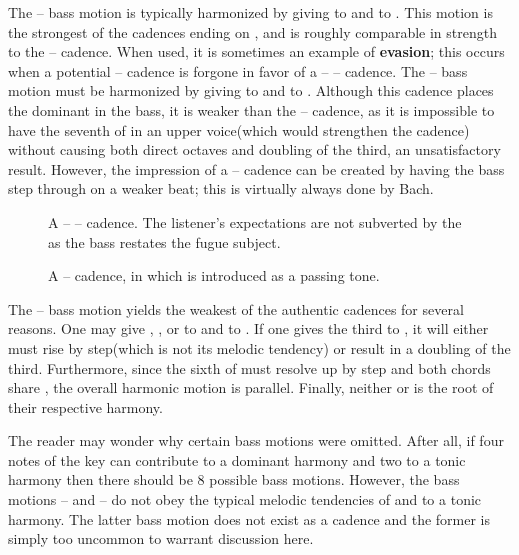 The  --  bass motion is typically harmonized by giving  to  and  to . This motion is the strongest of the cadences ending on , and is roughly comparable in strength to the  --  cadence. When used, it is sometimes an example of \textbf{evasion}; this occurs when a potential  --  cadence is forgone in favor of a  --  --  cadence. The  --  bass motion must be harmonized by giving  to  and  to . Although this cadence places the dominant in the bass, it is weaker than the  --  cadence, as it is impossible to have the seventh of  in an upper voice(which would strengthen the cadence) without causing both direct octaves and doubling of the third, an unsatisfactory result. However, the impression of a  --  cadence can be created by having the bass step through  on a weaker beat; this is virtually always done by Bach.
\begin{figure}[h]
\centering
{}
\caption{A  --  --  cadence. The listener's expectations are not subverted by the  as the bass restates the fugue subject. }
\end{figure}
\begin{figure}[h]
\centering
{}
\caption{A  --  cadence, in which  is introduced as a passing tone. }
\end{figure}
The  --  bass motion yields the weakest of the authentic cadences for several reasons. One may give , , or  to  and  to . If one gives the third to , it will either must rise by step(which is not its melodic tendency) or result in a doubling of the third. Furthermore, since the sixth of  must resolve up by step and both chords share , the overall harmonic motion is parallel. Finally, neither  or  is the root of their respective harmony.

The reader may wonder why certain bass motions were omitted. After all, if four notes of the key can contribute to a dominant harmony and two to a tonic harmony then there should be 8 possible bass motions. However, the bass motions  --  and  --  do not obey the typical melodic tendencies of  and  to a tonic harmony. The latter bass motion does not exist as a cadence and the former is simply too uncommon to warrant discussion here.


